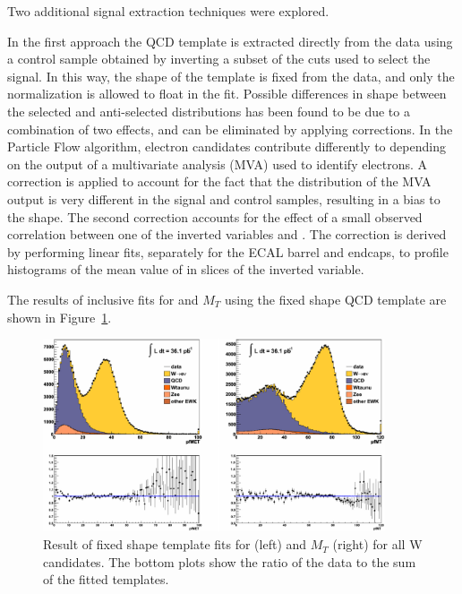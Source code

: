 Two additional signal extraction techniques were explored. 

In the first approach the QCD \MET template is extracted directly from the data using a
control sample obtained by inverting a subset of the cuts used to select the
signal. In this way, the shape of the template is fixed from the data, and
only the normalization is allowed to float in the fit. 
Possible differences in shape between the selected and anti-selected \MET
distributions has been found to be due to a combination of two effects,
and can be eliminated by applying corrections.  In the
Particle Flow algorithm, electron candidates contribute differently to
\MET depending on the output of a multivariate analysis (MVA) used to identify
electrons.  A correction is applied to account for the fact that the
distribution of the MVA output is very different in the signal and
control samples, resulting in a bias to the \MET shape.  The second
correction accounts for the effect of a small observed correlation between
one of the inverted variables and \MET.  The correction is derived by performing linear
fits, separately for the ECAL barrel and endcaps, to profile histograms of
the mean value of \MET in slices of the inverted variable.


The results of inclusive fits for \MET and $M_T$ using the fixed shape QCD
template are shown in Figure~\ref{fig:resultAll}.

\begin{figure}[htb]
  \begin{center}
    \includegraphics*[width=0.9\textwidth]{figs/resultsAll.pdf}
    \caption{Result of fixed shape template fits for \MET (left) and $M_T$
(right) for all W candidates.  The bottom plots show the ratio of the data to
the sum of the fitted templates.}
    \label{fig:resultAll}
  \end{center}
\end{figure}

